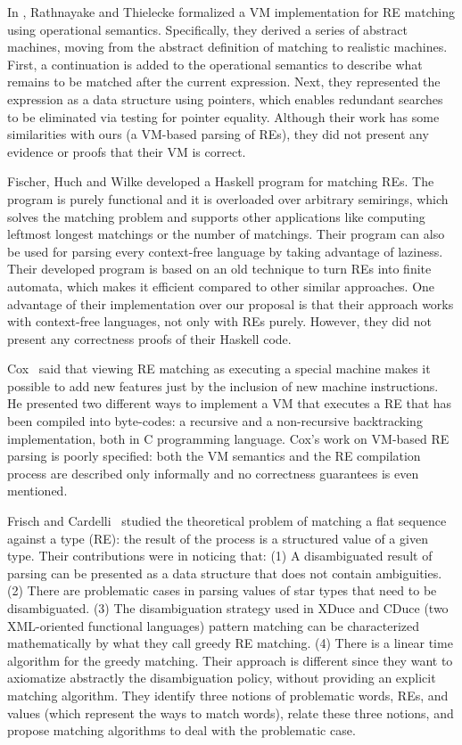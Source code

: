 \documentclass[sigplan]{acmart}
\theoremstyle{definition}
\begin{document}
In \cite{Rathnayake2011}, Rathnayake and Thielecke formalized a VM implementation for RE matching using
operational semantics. Specifically, they derived a series of abstract machines, moving from the abstract
definition of matching to realistic machines. First, a continuation is added to the operational semantics
to describe what remains to be matched after the current expression. Next, they represented the expression
as a data structure using pointers, which enables redundant searches to be eliminated via testing for pointer
equality. Although their work has some similarities with ours (a VM-based parsing of REs), they did not present
any evidence or proofs that their VM is correct.

Fischer, Huch and Wilke \cite{Fischer2010} developed a Haskell program for matching REs. The program is purely
functional and it is overloaded over arbitrary semirings, which solves the matching problem and supports other
applications like computing leftmost longest matchings or the number of matchings. Their program can also be used
for parsing every context-free language by taking advantage of laziness. Their developed program is based on an
old technique to turn REs into finite automata, which makes it efficient compared to other similar approaches.
One advantage of their implementation over our proposal is that their approach works with context-free languages,
not only with REs purely. However, they did not present any correctness proofs of their Haskell code.

Cox~\cite{Cox2009} said that viewing RE matching as executing a special machine makes it possible to add new
features just by the inclusion of new machine instructions. He presented two different ways to implement
a VM that executes a RE that has been compiled into  byte-codes: a recursive and a non-recursive
backtracking implementation, both in C programming language. Cox's work on VM-based RE parsing is poorly specified:
both the VM semantics and the RE compilation process are described only informally
and no correctness guarantees is even mentioned.

Frisch and Cardelli~\cite{Frisch2004} studied the theoretical problem of matching a flat sequence against a type (RE): the
result of the process is a structured value of a given type. Their contributions were in noticing that: (1) A disambiguated
result of parsing can be presented as a data structure that does not contain ambiguities. (2) There are problematic cases in
parsing values of star types that need to be disambiguated. (3) The disambiguation strategy used in XDuce and CDuce (two
XML-oriented functional languages) pattern matching can be characterized mathematically by what they call greedy RE matching.
(4) There is a linear time algorithm for the greedy matching. Their approach is different since they want to axiomatize abstractly
the disambiguation policy, without providing an explicit matching algorithm. They identify three notions of problematic words, REs,
and values (which represent the ways to match words), relate these three notions, and propose matching algorithms to deal with the
problematic case.
\end{document}
